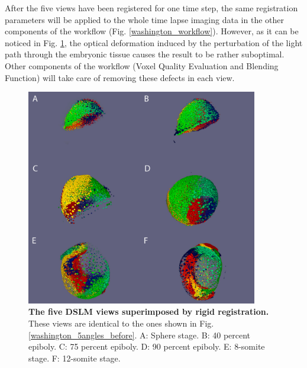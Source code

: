    After the five views have been registered for one time step, the same registration parameters will be applied to the whole time lapse imaging data in the other components of the workflow (Fig. \ref{washington_workflow}). However, as it can be noticed in Fig. \ref{washington_5angles_after}, the optical deformation induced by the perturbation of the light path through the embryonic tissue causes the result to be rather suboptimal. Other components of the workflow (Voxel Quality Evaluation and Blending Function) will take care of removing these defects in each view.  
\begin{figure}
\begin{center}
\includegraphics[width=0.9\textwidth]{../../images/Reconstruction/washington/5angles_after_letter.png}
\end{center}
\caption{\textbf{The five DSLM views superimposed by rigid registration.} These views are identical to the ones shown in Fig. \ref{washington_5angles_before}. A: Sphere stage. B: 40 percent epiboly. C: 75 percent epiboly. D: 90 percent epiboly. E: 8-somite stage. F: 12-somite stage.}
\label{washington_5angles_after}
\end{figure}

